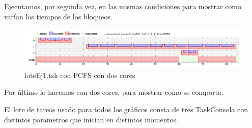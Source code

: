 Ejecutamos, por segunda vez, en las mismas condiciones para mostrar como varían los tiempos de los bloqueos.

\begin{figure}[H]
  \centering
    \includegraphics[width=1.1\textwidth]{imagenes/Ex3Ej1.png}
  \caption{loteEj1.tsk con FCFS con dos cores}
\end{figure}

Por último lo hacemos con dos cores, para mostrar como se comporta. 

El lote de tareas usado para todos los gráficos consta de tres TaskConsola con distintos parametros que inician en distintos momentos.